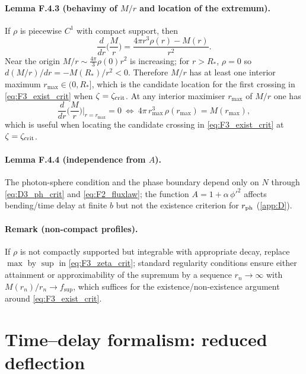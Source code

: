 \documentclass{iopjournal}
\begin{document}
\paragraph{Lemma F.4.3 (behavimy of $M/r$ and location of the extremum).}
If $\rho$ is piecewise $C^{1}$ with compact support, then
\[
\frac{d}{dr}\!\Big(\frac{M}{r}\Big)=\frac{4\pi r^{3}\rho(r)-M(r)}{r^{2}}.
\]
Near the origin $M/r\sim \tfrac{4\pi}{3}\rho(0)r^{2}$ is increasing; for $r>R_\ast$, $\rho=0$ so $d(M/r)/dr=-M(R_\ast)/r^{2}<0$. Therefore $M/r$ has at least one interior maximum $r_{\max}\in(0,R_\ast]$, which is the candidate location for the first crossing in \eqref{eq:F3_exist_crit} when $\zeta=\zeta_{\rm crit}$.
At any interior maximiser $r_{\max}$ of $M/r$ one has
\begin{equation}
\frac{d}{dr}\!\Big(\frac{M}{r}\Big)\Big|_{r=r_{\max}}=0
\ \Longleftrightarrow\
4\pi\,r_{\max}^{3}\,\rho(r_{\max})=M(r_{\max}),
\label{eq:F4_maximiser_identity}
\end{equation}
which is useful when locating the candidate crossing in \eqref{eq:F3_exist_crit} at $\zeta=\zeta_{\rm crit}$.

\paragraph{Lemma F.4.4 (independence from $A$).}
The photon-sphere condition and the phase boundary depend only on $N$ through \eqref{eq:D3_ph_crit} and \eqref{eq:F2_fluxlaw}; the function $A=1+\alpha\,\phi'^{2}$ affects bending/time delay at finite $b$ but not the existence criterion for $r_{\rm ph}$ (\cref{app:D}).

\paragraph{Remark (non-compact profiles).}
If $\rho$ is not compactly supported but integrable with appropriate decay, replace $\max$ by $\sup$ in \eqref{eq:F3_zeta_crit}; standard regularity conditions ensure either attainment or approximability of the supremum by a sequence $r_n\to\infty$ with $M(r_n)/r_n\to f_{\sup}$, which suffices for the existence/non-existence argument around \eqref{eq:F3_exist_crit}.

\section{Time–delay formalism: reduced deflection}\label{app:G}
\end{document}
